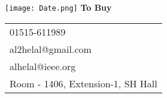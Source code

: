 \documentclass{article}
\begin{document}
\vspace*{\fill}
\begin{center}
  \texttt{[image: Date.png]}
  {\Huge\textbf{To Buy}}
\\
  \LARGE
\vspace{2cm}
  \begin{tabular}{l}
 \faPhone{} 01515-611989\\
  \faEnvelope{} al2helal@gmail.com\\
  \faEnvelope{} alhelal@ieee.org\\
  \faHome{} Room - 1406, Extension-1, SH Hall
  \end{tabular}
\end{center}
\vspace*{\fill}
 
\end{document}
